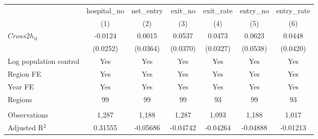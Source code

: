 \begingroup
\centering
\begin{tabular}{lcccccc}
   \toprule
                          & hospital\_no  & net\_entry  & exit\_no  & exit\_rate  & entry\_no  & entry\_rate \\    
                          & (1)           & (2)         & (3)       & (4)         & (5)        & (6)\\  
   \midrule 
   $Cross2h_{it}$         & -0.0124       & 0.0015      & 0.0537    & 0.0473      & 0.0623     & 0.0448\\   
                          & (0.0252)      & (0.0364)    & (0.0370)  & (0.0327)    & (0.0538)   & (0.0420)\\   
   Log population control & Yes           & Yes         & Yes       & Yes         & Yes        & Yes\\  
   Region FE              & Yes           & Yes         & Yes       & Yes         & Yes        & Yes\\  
   Year FE                & Yes           & Yes         & Yes       & Yes         & Yes        & Yes\\  
   Regions                & 99            & 99          & 99        & 93          & 99         & 93\\  
    \\
   Observations           & 1,287         & 1,188       & 1,287     & 1,093       & 1,188      & 1,017\\  
   Adjusted R$^2$         & 0.31555       & -0.05686    & -0.04742  & -0.04264    & -0.04888   & -0.01213\\  
   \bottomrule
\end{tabular}
\par\endgroup
